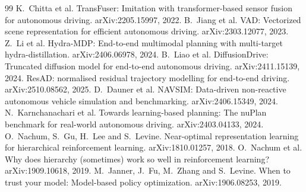 \documentclass[10pt,twocolumn]{article}
\theoremstyle{remark}
\begin{document}
\begin{thebibliography}{99}
 K.~Chitta et al. TransFuser: Imitation with transformer-based sensor fusion for autonomous driving. arXiv:2205.15997, 2022.
 B.~Jiang et al. VAD: Vectorized scene representation for efficient autonomous driving. arXiv:2303.12077, 2023.
 Z.~Li et al. Hydra-MDP: End-to-end multimodal planning with multi-target hydra-distillation. arXiv:2406.06978, 2024.
 B.~Liao et al. DiffusionDrive: Truncated diffusion model for end-to-end autonomous driving. arXiv:2411.15139, 2024.
 ResAD: normalised residual trajectory modelling for end-to-end driving. arXiv:2510.08562, 2025.
 D.~Dauner et al. NAVSIM: Data-driven non-reactive autonomous vehicle simulation and benchmarking. arXiv:2406.15349, 2024.
 N.~Karnchanachari et al. Towards learning-based planning: The nuPlan benchmark for real-world autonomous driving. arXiv:2403.04133, 2024.
 O.~Nachum, S.~Gu, H.~Lee and S.~Levine. Near-optimal representation learning for hierarchical reinforcement learning. arXiv:1810.01257, 2018.
 O.~Nachum et al. Why does hierarchy (sometimes) work so well in reinforcement learning? arXiv:1909.10618, 2019.
 M.~Janner, J.~Fu, M.~Zhang and S.~Levine. When to trust your model: Model-based policy optimization. arXiv:1906.08253, 2019.
\end{thebibliography}
\end{document}

